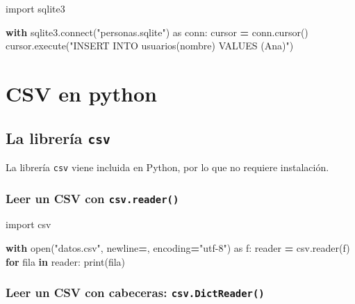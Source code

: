 \documentclass[
]{book}
\newenvironment{Shaded}{\begin{snugshade}}{\end{snugshade}}
\newcommand{\BuiltInTok}[1]{#1}
\newcommand{\ControlFlowTok}[1]{\textcolor[rgb]{0.13,0.29,0.53}{\textbf{#1}}}
\newcommand{\ExtensionTok}[1]{#1}
\newcommand{\ImportTok}[1]{#1}
\newcommand{\KeywordTok}[1]{\textcolor[rgb]{0.13,0.29,0.53}{\textbf{#1}}}
\newcommand{\NormalTok}[1]{#1}
\newcommand{\OperatorTok}[1]{\textcolor[rgb]{0.81,0.36,0.00}{\textbf{#1}}}
\newcommand{\StringTok}[1]{\textcolor[rgb]{0.31,0.60,0.02}{#1}}
\theoremstyle{break}
\theoremstyle{nonumberplain}
\begin{document}
\begin{Shaded}
\begin{Highlighting}[]
\ImportTok{import}\NormalTok{ sqlite3}

\ControlFlowTok{with}\NormalTok{ sqlite3.}\ExtensionTok{connect}\NormalTok{(}\StringTok{"personas.sqlite"}\NormalTok{) }\ImportTok{as}\NormalTok{ conn:}
\NormalTok{    cursor }\OperatorTok{=}\NormalTok{ conn.cursor()}
\NormalTok{    cursor.execute(}\StringTok{"INSERT INTO usuarios(nombre) VALUES (\textquotesingle{}Ana\textquotesingle{})"}\NormalTok{)}
\end{Highlighting}
\end{Shaded}

\section{CSV en python}\label{csv-en-python}

\subsection{\texorpdfstring{La librería \texttt{csv}}{La librería csv}}\label{la-libreruxeda-csv}

La librería \texttt{csv} viene incluida en Python, por lo que no requiere instalación.

\subsubsection{\texorpdfstring{Leer un CSV con \texttt{csv.reader()}}{Leer un CSV con csv.reader()}}\label{leer-un-csv-con-csv.reader}

\begin{Shaded}
\begin{Highlighting}[]
\ImportTok{import}\NormalTok{ csv}

\ControlFlowTok{with} \BuiltInTok{open}\NormalTok{(}\StringTok{"datos.csv"}\NormalTok{, newline}\OperatorTok{=}\StringTok{\textquotesingle{}\textquotesingle{}}\NormalTok{, encoding}\OperatorTok{=}\StringTok{"utf{-}8"}\NormalTok{) }\ImportTok{as}\NormalTok{ f:}
\NormalTok{    reader }\OperatorTok{=}\NormalTok{ csv.reader(f)}
    \ControlFlowTok{for}\NormalTok{ fila }\KeywordTok{in}\NormalTok{ reader:}
        \BuiltInTok{print}\NormalTok{(fila)}
\end{Highlighting}
\end{Shaded}

\subsubsection{\texorpdfstring{Leer un CSV con cabeceras: \texttt{csv.DictReader()}}{Leer un CSV con cabeceras: csv.DictReader()}}\label{leer-un-csv-con-cabeceras-csv.dictreader}
\end{document}
